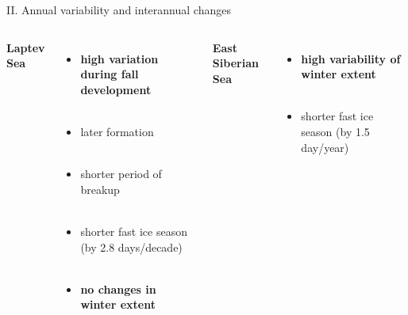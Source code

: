 \documentclass[8pt]{beamer}
\begin{document}
\setwatermark{\fontsize{125pt}{125pt}\selectfont{}}
\begin{frame}[fragile]{II. Annual variability and interannual changes}
\begin{columns}
	\centering
	\textbf{Laptev Sea}\\~\\
	\begin{itemize}
		\item \textbf{high variation during fall development}\\~\\
		\item later formation\\~\\
		\item shorter period of breakup\\~\\
		\item shorter fast ice season (by 2.8 days/decade)\\~\\
		\item \textbf{no changes in winter extent}\\~\\
	\end{itemize}
	
	\centering
	\textbf{East Siberian Sea}\\~\\
	\begin{itemize}
		\item \textbf{high variability of winter extent}\\~\\
		\item shorter fast ice season (by 1.5 day/year) 
	\end{itemize}
\end{columns}
\end{frame}
\end{document}
